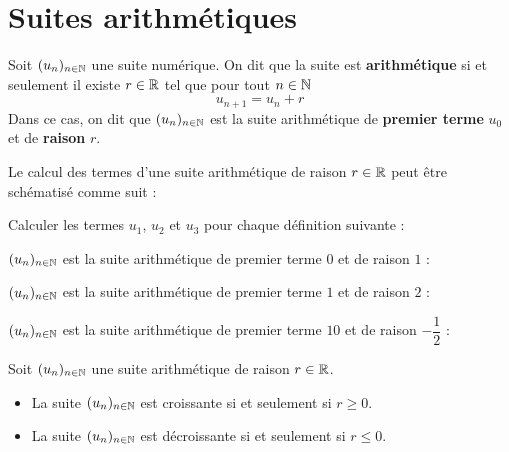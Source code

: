 \documentclass{poly}
\begin{document}
\section{Suites arithmétiques}
\begin{definition}
Soit $(u_n)_{n \in \mathbb{N}}$ une suite numérique. On dit que la suite est \textbf{arithmétique} si et seulement il existe $r \in \mathbb{R}$ tel que pour tout $n \in \mathbb{N}$
\begin{equation*}
u_{n+1} = u_n + r
\end{equation*}
Dans ce cas, on dit que $(u_n)_{n \in \mathbb{N}}$ est la suite arithmétique de \textbf{premier terme} $u_0$ et de \textbf{raison} $r$.
\end{definition}
\begin{remark}
Le calcul des termes d'une suite arithmétique de raison $r \in \mathbb{R}$ peut être schématisé comme suit :
\begin{center}
\end{center}
\end{remark}
\begin{example}
Calculer les termes $u_1$, $u_2$ et $u_3$ pour chaque définition suivante :
\begin{alphaquestions}
\item $(u_n)_{n \in \mathbb{N}}$ est la suite arithmétique de premier terme $0$ et de raison $1$ : 
\item $(u_n)_{n \in \mathbb{N}}$ est la suite arithmétique de premier terme $1$ et de raison $2$ : 
\item $(u_n)_{n \in \mathbb{N}}$ est la suite arithmétique de premier terme $10$ et de raison $-\dfrac{1}{2}$ : 
\end{alphaquestions}
\end{example}
\begin{proposition}
Soit $(u_n)_{n \in \mathbb{N}}$ une suite arithmétique de raison $r \in \mathbb{R}$.
\begin{itemize}
\item La suite $(u_n)_{n \in \mathbb{N}}$ est croissante si et seulement si $r \geq 0$. 
\item La suite $(u_n)_{n \in \mathbb{N}}$ est décroissante si et seulement si $r \leq 0$. 
\end{itemize}
\end{proposition}
\end{document}
